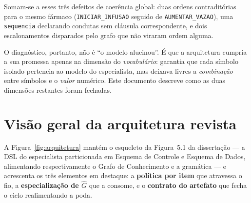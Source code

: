 \documentclass[11pt,a4paper]{article}
\begin{document}
Somam-se a esses três defeitos de coerência global: duas ordens contraditórias
para o mesmo fármaco (\texttt{INICIAR\_INFUSAO} seguido de
\texttt{AUMENTAR\_VAZAO}), uma \texttt{sequencia} declarando condutas sem
cláusula correspondente, e dois escalonamentos disparados pelo grafo que não
viraram ordem alguma.

O diagnóstico, portanto, não é ``o modelo alucinou''. É que a arquitetura
cumpria a sua promessa apenas na dimensão do \emph{vocabulário}: garantia que
cada símbolo isolado pertencia ao modelo do especialista, mas deixava livres a
\emph{combinação} entre símbolos e o \emph{valor} numérico. Este documento
descreve como as duas dimensões restantes foram fechadas.

\section{Visão geral da arquitetura revista}

A Figura~\ref{fig:arquitetura} mantém o esqueleto da Figura~5.1 da dissertação
--- a DSL do especialista particionada em Esquema de Controle e Esquema de
Dados, alimentando respectivamente o Grafo de Conhecimento e a gramática --- e
acrescenta os três elementos em destaque: a \textbf{política por item} que
atravessa o fio, a \textbf{especialização de $\hat{G}$} que a consome, e o
\textbf{contrato do artefato} que fecha o ciclo realimentando a poda.
\end{document}
